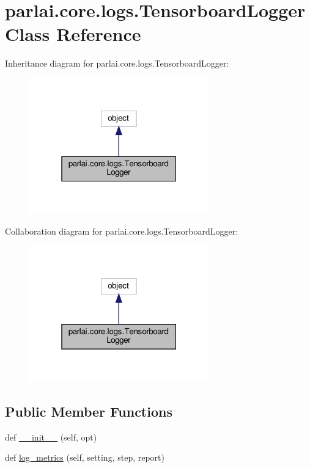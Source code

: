 \hypertarget{classparlai_1_1core_1_1logs_1_1TensorboardLogger}{}\section{parlai.\+core.\+logs.\+Tensorboard\+Logger Class Reference}
\label{classparlai_1_1core_1_1logs_1_1TensorboardLogger}


Inheritance diagram for parlai.\+core.\+logs.\+Tensorboard\+Logger\+:
\nopagebreak
\begin{figure}[H]
\begin{center}
\leavevmode
\includegraphics[width=220pt]{dc/d92/classparlai_1_1core_1_1logs_1_1TensorboardLogger__inherit__graph}
\end{center}
\end{figure}


Collaboration diagram for parlai.\+core.\+logs.\+Tensorboard\+Logger\+:
\nopagebreak
\begin{figure}[H]
\begin{center}
\leavevmode
\includegraphics[width=220pt]{d6/d20/classparlai_1_1core_1_1logs_1_1TensorboardLogger__coll__graph}
\end{center}
\end{figure}
\subsection*{Public Member Functions}
\begin{DoxyCompactItemize}
\item 
def \hyperlink{classparlai_1_1core_1_1logs_1_1TensorboardLogger_a771ea3df52af2ad82a038446fb15fdf3}{\+\_\+\+\_\+init\+\_\+\+\_\+} (self, opt)
\item 
def \hyperlink{classparlai_1_1core_1_1logs_1_1TensorboardLogger_adf20c983722dcd7ff933aaf9dab672f4}{log\+\_\+metrics} (self, setting, step, report)
\end{DoxyCompactItemize}
